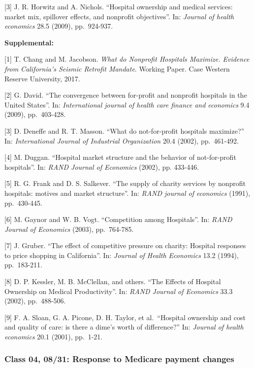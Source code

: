 \documentclass[11pt,]{article}
\begin{document}
{[}3{]} J. R. Horwitz and A. Nichols. ``Hospital ownership and medical
services: market mix, spillover effects, and nonprofit objectives''. In:
\emph{Journal of health economics} 28.5 (2009), pp.~924-937.

\textbf{Supplemental:}

{[}1{]} T. Chang and M. Jacobson. \emph{What do Nonprofit Hospitals
Maximize. Evidence from California's Seismic Retrofit Mandate}. Working
Paper. Case Western Reserve University, 2017.

{[}2{]} G. David. ``The convergence between for-profit and nonprofit
hospitals in the United States''. In: \emph{International journal of
health care finance and economics} 9.4 (2009), pp.~403-428.

{[}3{]} D. Deneffe and R. T. Masson. ``What do not-for-profit hospitals
maximize?'' In: \emph{International Journal of Industrial Organization}
20.4 (2002), pp.~461-492.

{[}4{]} M. Duggan. ``Hospital market structure and the behavior of
not-for-profit hospitals''. In: \emph{RAND Journal of Economics} (2002),
pp. 433-446.

{[}5{]} R. G. Frank and D. S. Salkever. ``The supply of charity services
by nonprofit hospitals: motives and market structure''. In: \emph{RAND
journal of economics} (1991), pp.~430-445.

{[}6{]} M. Gaynor and W. B. Vogt. ``Competition among Hospitals''. In:
\emph{RAND Journal of Economics} (2003), pp.~764-785.

{[}7{]} J. Gruber. ``The effect of competitive pressure on charity:
Hospital responses to price shopping in California''. In: \emph{Journal
of Health Economics} 13.2 (1994), pp.~183-211.

{[}8{]} D. P. Kessler, M. B. McClellan, and others. ``The Effects of
Hospital Ownership on Medical Productivity''. In: \emph{RAND Journal of
Economics} 33.3 (2002), pp.~488-506.

{[}9{]} F. A. Sloan, G. A. Picone, D. H. Taylor, et al.~``Hospital
ownership and cost and quality of care: is there a dime's worth of
difference?'' In: \emph{Journal of health economics} 20.1 (2001),
pp.~1-21.

\hypertarget{class-04-0831-response-to-medicare-payment-changes}{%
\subsubsection{Class 04, 08/31: Response to Medicare payment
changes}\label{class-04-0831-response-to-medicare-payment-changes}}
\end{document}
